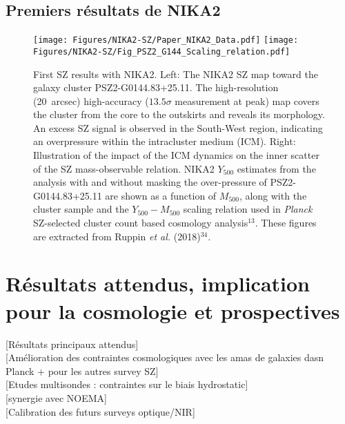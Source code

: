 \subsection{Premiers résultats de NIKA2}
{\color{vert}\lipsum[2-4]}

\begin{figure}
  \centering
  \texttt{[image: Figures/NIKA2-SZ/Paper\_NIKA2\_Data.pdf]}
  \texttt{[image: Figures/NIKA2-SZ/Fig\_PSZ2\_G144\_Scaling\_relation.pdf]}
  \caption{First SZ results with NIKA2. Left: The NIKA2 SZ map toward the galaxy cluster PSZ2-G0144.83+25.11. The high-resolution (20~arcsec) high-accuracy ($13.5\sigma $ measurement at peak) map covers the cluster from the core to the outskirts and reveals its morphology. An excess SZ signal is observed in the South-West region, indicating an overpressure within the intracluster medium (ICM). Right: Illustration of the impact of the ICM dynamics on the inner scatter of the SZ mass-observable relation. NIKA2 $Y_{500}$ estimates from the analysis with and without masking the over-pressure of PSZ2-G0144.83+25.11 are shown as a function of $M_{500}$, along with the cluster sample and the $Y_{500}-M_{500}$ scaling relation used in \emph{Planck} SZ-selected cluster count based cosmology analysis$^{13}$. These figures are extracted from Ruppin {\it et al.} (2018)$^{34}$. }
  \label{fig:nika2-sz}
\end{figure}



%
%
%
%
%
%
%
%
\section{Résultats attendus, implication pour la cosmologie et
  prospectives}


[Résultats principaux attendus] \\

[Amélioration des contraintes cosmologiques avec les amas de galaxies
  dasn Planck + pour les autres survey SZ]\\

[Etudes multisondes : contraintes sur le biais hydrostatic]\\

[synergie avec NOEMA]\\

[Calibration des futurs surveys optique/NIR]\\
